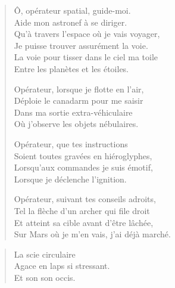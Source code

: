 \begin{verse}\quatrain\sizain
  Ô, opérateur spatial, guide-moi.\\ 
  Aide mon astronef à se diriger.\\ 
  Qu’à travers l’espace où je vais voyager,\\ 
  Je puisse trouver assurément la voie.\\ 
  La voie pour tisser dans le ciel ma toile\\ 
  Entre les planètes et les étoiles.  %

  Opérateur, lorsque je flotte en l’air,\\ 
  Déploie le canadarm%
   pour me saisir\\  %
  Dans ma sortie extra-véhiculaire\\  %
  Où j’observe les objets nébulaires.  %

  Opérateur, que tes instructions\\  %
  Soient toutes gravées en hiéroglyphes,\\  %
  Lorsqu’aux commandes je suis émotif,\\  %
  Lorsque je déclenche l’ignition.  %

  Opérateur, suivant tes conseils adroits,\\ 
  Tel la flèche d’un archer qui file droit\\ 
  Et atteint sa cible avant d’être lâchée,\\ 
  Sur Mars où je m’en vais, j’ai déjà marché.  %
\end{verse}


\begin{verse}\haiku
  La scie circulaire\\  %
  Agace en laps si stressant.\\  %
  Et son son occis.
\end{verse}

